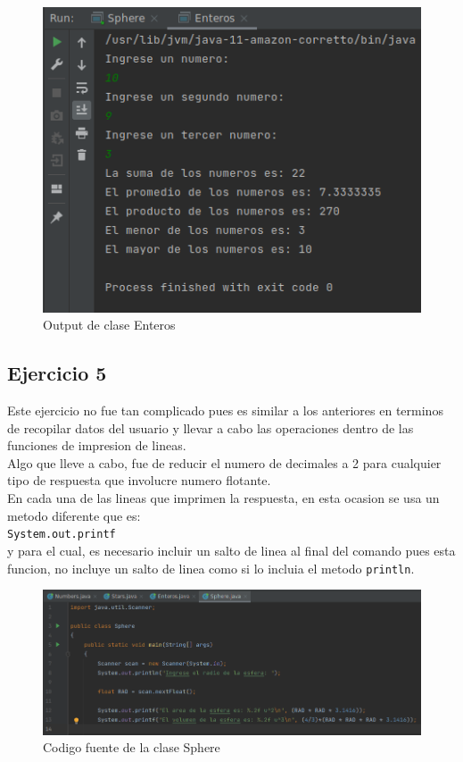 \documentclass{article}
\begin{document}
 		\begin{figure}[H]
 			\centering
 			\includegraphics[scale = 0.6]{images/enterosout}
 			\caption{Output de clase Enteros}
 		\end{figure}
 	
 		\subsection{Ejercicio 5}
 		
 		Este ejercicio no fue tan complicado pues es similar a los anteriores en terminos de recopilar datos del usuario y llevar a cabo las operaciones dentro de las funciones de impresion de lineas.\\
 		
 		Algo que lleve a cabo, fue de reducir el numero de decimales a 2 para cualquier tipo de respuesta que involucre numero flotante.\\
 	
 		En cada una de las lineas que imprimen la respuesta, en esta ocasion se usa un metodo diferente que es:\\
 		
 		\verb*|System.out.printf|\\
 		
 		y para el cual, es necesario incluir un salto de linea al final del comando pues esta funcion, no incluye un salto de linea como si lo incluia el metodo \verb*|println|.
 		
 		\begin{figure}[H]
 			\centering
 			\includegraphics[scale = 0.5]{images/sphere}
 			\caption{Codigo fuente de la clase Sphere}
 		\end{figure}
 		
\end{document}
